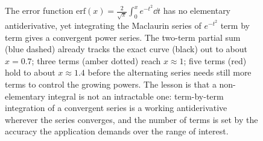 \begin{figure}[htbp]
\centering
{}
\caption[Error function by term-by-term integration]{The error
function $\mathrm{erf}(x) = \tfrac{2}{\sqrt{\pi}}\int_{0}^{x}
e^{-t^{2}}\dd t$ has no elementary antiderivative, yet integrating the
Maclaurin series of $e^{-t^{2}}$ term by term gives a convergent power
series. The two-term partial sum (blue dashed) already tracks the exact
curve (black) out to about $x = 0.7$; three terms (amber dotted) reach
$x \approx 1$; five terms (red) hold to about $x \approx 1.4$ before the
alternating series needs still more terms to control the growing powers.
The lesson is that a non-elementary integral is not an intractable one:
term-by-term integration of a convergent series is a working
antiderivative wherever the series converges, and the number of terms is
set by the accuracy the application demands over the range of interest.}
\label{fig:vol02ch06:erf-series}
\end{figure}
